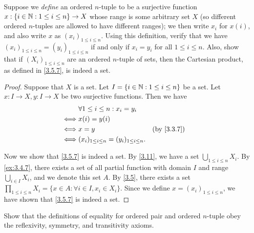 \begin{ex}\label{ex:3.5.2}
  Suppose we \emph{define} an ordered \(n\)-tuple to be a surjective function \(x : \{i \in \mathbb{N} : 1 \leq i \leq n\} \to X\) whose range is some arbitrary set \(X\) (so different ordered \(n\)-tuples are allowed to have different ranges);
  we then write \(x_i\) for \(x(i)\), and also write \(x\) as \((x_i)_{1 \leq i \leq n}\).
  Using this definition, verify that we have \((x_i)_{1 \leq i \leq n} = (y_i)_{1 \leq i \leq n}\) if and only if \(x_i = y_i\) for all \(1 \leq i \leq n\).
  Also, show that if \((X_i)_{1 \leq i \leq n}\) are an ordered \(n\)-tuple of sets, then the Cartesian product, as defined in \cref{3.5.7}, is indeed a set.
\end{ex}

\begin{proof}
  Suppose that \(X\) is a set.
  Let \(I = \{i \in \mathbb{N} : 1 \leq i \leq n\}\) be a set.
  Let \(x : I \to X, y : I \to X\) be two surjective functions.
  Then we have
  \begin{align*}
         & \forall 1 \leq i \leq n : x_i = y_i                                \\
    \iff & x(i) = y(i)                                                        \\
    \iff & x = y                                              &  & \by{3.3.7} \\
    \iff & (x_i)_{1 \leq i \leq n} = (y_i)_{1 \leq i \leq n}.
  \end{align*}

  Now we show that \cref{3.5.7} is indeed a set.
  By \cref{3.11}, we have a set \(\bigcup_{1 \leq i \leq n} X_i\).
  By \cref{ex:3.4.7}, there exists a set of all partial function with domain \(I\) and range \(\bigcup_{i \in I} X_i\), and we denote this set \(A\).
  By \cref{3.5}, there exists a set \(\prod_{1 \leq i \leq n} X_i = \{x \in A : \forall i \in I, x_i \in X_i\}\).
  Since we define \(x = (x_i)_{1 \leq i \leq n}\), we have shown that \cref{3.5.7} is indeed a set.
\end{proof}

\begin{ex}\label{ex:3.5.3}
  Show that the definitions of equality for ordered pair and ordered \(n\)-tuple obey the reflexivity, symmetry, and transitivity axioms.
\end{ex}

